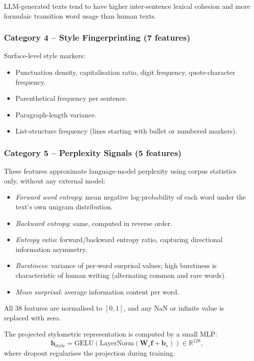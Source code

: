 LLM-generated texts tend to have higher inter-sentence lexical cohesion and more formulaic transition word usage than human texts.

\subsubsection{Category 4 -- Style Fingerprinting (7 features)}
Surface-level style markers:
\begin{itemize}
  \item Punctuation density, capitalisation ratio, digit frequency, quote-character frequency.
  \item Parenthetical frequency per sentence.
  \item Paragraph-length variance.
  \item List-structure frequency (lines starting with bullet or numbered markers).
\end{itemize}

\subsubsection{Category 5 -- Perplexity Signals (5 features)}
These features approximate language-model perplexity using corpus statistics only, without any external model:
\begin{itemize}
  \item \textit{Forward word entropy}: mean negative log-probability of each word under the text's own unigram distribution.
  \item \textit{Backward entropy}: same, computed in reverse order.
  \item \textit{Entropy ratio}: forward/backward entropy ratio, capturing directional information asymmetry.
  \item \textit{Burstiness}: variance of per-word surprisal values; high burstiness is characteristic of human writing (alternating common and rare words).
  \item \textit{Mean surprisal}: average information content per word.
\end{itemize}

All 38 features are normalised to $[0,1]$, and any NaN or infinite value is replaced with zero.

The projected stylometric representation is computed by a small MLP:
\begin{equation}
  \mathbf{h}_{\text{style}} = \text{GELU}(\text{LayerNorm}(\mathbf{W}_s \mathbf{f} + \mathbf{b}_s)) \in \mathbb{R}^{128},
\end{equation}
where dropout regularises the projection during training.

